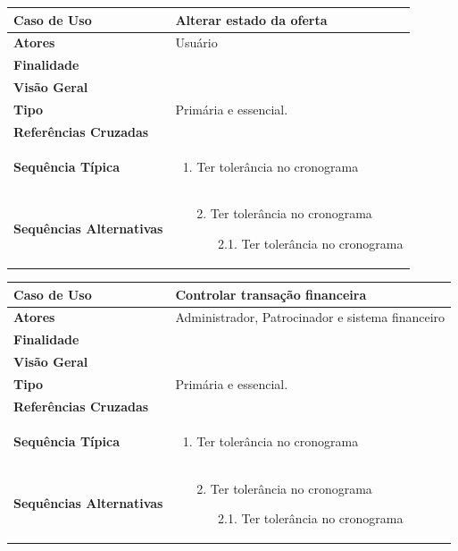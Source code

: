 \documentclass[a4paper,11pt]{article}
\begin{document}
\begin{table}[H]
		\begin{tabularx}{\textwidth}{|l|X|}
		\hline
			\textbf{Caso de Uso} &  Alterar estado da oferta \\ \hline
			\textbf{Atores} &  Usuário  \\ \hline
			\textbf{Finalidade} &   \\ \hline
			\textbf{Visão Geral} &  \\ \hline
			\textbf{Tipo} & Primária e essencial. \\ \hline
			\textbf{Referências Cruzadas} &  \\ \hline
			\textbf{Sequência Típica} & 
			\begin{enumerate}
			\item Ter tolerância no cronograma
			\end{enumerate} \\ \hline
			
			\textbf{Sequências Alternativas} & 
			\begin{itemize}
				\item[2.] Ter tolerância no cronograma
				\begin{itemize}
					\item[2.1.] Ter tolerância no cronograma
				\end{itemize}
			\end{itemize} \\ \hline
		\end{tabularx}
\end{table}

\begin{table}[H]
		\begin{tabularx}{\textwidth}{|l|X|}
		\hline
			\textbf{Caso de Uso} &  Controlar transação financeira \\ \hline
			\textbf{Atores} &  Administrador, Patrocinador e sistema financeiro  \\ \hline
			\textbf{Finalidade} &   \\ \hline
			\textbf{Visão Geral} &  \\ \hline
			\textbf{Tipo} & Primária e essencial. \\ \hline
			\textbf{Referências Cruzadas} &  \\ \hline
			\textbf{Sequência Típica} & 
			\begin{enumerate}
			\item Ter tolerância no cronograma
			\end{enumerate} \\ \hline
			
			\textbf{Sequências Alternativas} & 
			\begin{itemize}
				\item[2.] Ter tolerância no cronograma
				\begin{itemize}
					\item[2.1.] Ter tolerância no cronograma
				\end{itemize}
			\end{itemize} \\ \hline
		\end{tabularx}
\end{table}
\end{document}
